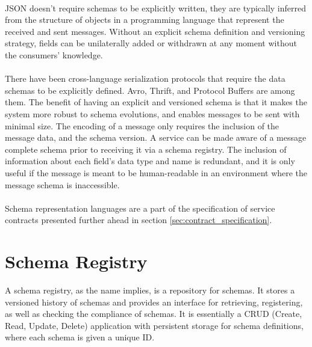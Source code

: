 \paragraph{}

JSON doesn't require schemas to be explicitly written, they are typically inferred from the structure of objects in a programming language that represent the received and sent messages.
Without an explicit schema definition and versioning strategy, fields can be unilaterally added or withdrawn at any moment without the consumers' knowledge.

\paragraph{}

There have been cross-language serialization protocols that require the data schemas to be explicitly defined.
Avro, Thrift, and Protocol Buffers \cite{8,9,10} are among them.
The benefit of having an explicit and versioned schema is that it makes the system more robust to schema evolutions, and
enables messages to be sent with minimal size.
The encoding of a message only requires the inclusion of the message data, and the schema version.
A service can be made aware of a message complete schema prior to receiving it via a schema registry.
The inclusion of information about each field's data type and name is redundant,
and it is only useful if the message is meant to be human-readable in an environment where the message schema is inaccessible.

\paragraph{}

Schema representation languages are a part of the specification of service contracts
presented further ahead in section \ref{sec:contract_specification}.

\section{Schema Registry} %
\label{sec:schema_registry}

A schema registry, as the name implies, is a repository for schemas.
It stores a versioned history of schemas and provides an interface for retrieving, registering, as well as checking the compliance of schemas.
It is essentially a CRUD (Create, Read, Update, Delete) application with persistent storage for schema definitions, where each schema is given a unique ID.

